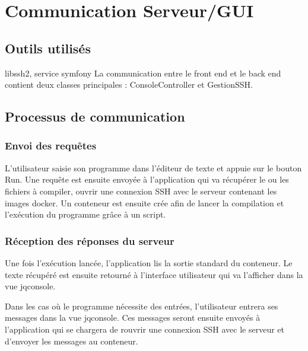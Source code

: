 \section{Communication Serveur/GUI}

\subsection{Outils utilisés}

libssh2, service symfony
La communication entre le front end et le back end contient deux classes principales : ConsoleController et GestionSSH.

\subsection{Processus de communication}

\subsubsection{Envoi des requêtes}

\par L’utilisateur saisie son programme dans l’éditeur de texte et appuie sur le bouton Run. Une requête est ensuite envoyée à l'application qui va récupérer le ou les fichiers à compiler, ouvrir une connexion SSH avec le serveur contenant les images docker. Un conteneur est ensuite crée afin de lancer la compilation et l’exécution du programme grâce à un script. 

\subsubsection{Réception des réponses du serveur}

\par Une fois l'exécution lancée, l'application lis la sortie standard du conteneur. Le texte récupéré est ensuite retourné à l'interface utilisateur qui va l'afficher dans la vue jqconsole.

\par Dans les cas où le programme nécessite des entrées, l'utilisateur entrera ses messages dans la vue jqconsole. Ces messages seront ensuite envoyés à l'application qui se chargera de rouvrir une connexion SSH avec le serveur et d'envoyer les messages au conteneur.